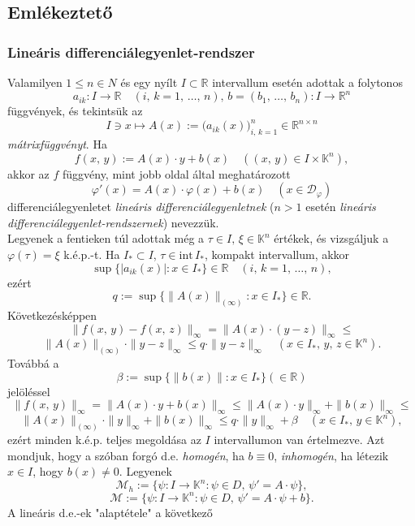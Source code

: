 \documentclass{article}
\newcommand{\R}{\mathbb{R}}
\newcommand{\K}{\mathbb{K}}
\newcommand{\Dp}{\mathcal{D}_\varphi}
\begin{document}
	\subsection{Emlékeztető}
	\subsubsection{Lineáris differenciálegyenlet-rendszer}
	Valamilyen $1 \leq n \in N$ és egy nyílt $I \subset \R$ intervallum esetén adottak a folytonos
	\[
		a_{ik} : I \to \R \quad (i, \, k = 1, \, \dots, \, n), \, b = (b_1, \, \dots, \, b_n) : I \to \R^n
	\]
	függvények, és tekintsük az
	\[
		I \ni x \mapsto A(x) := \big( a_{ik}(x) \big)_{i, \, k =1}^n \in \R^{n \times n}
	\]
	\textit{mátrixfüggvényt}. Ha
	\[
		f(x, \, y) := A(x) \cdot y + b(x) \quad ((x, \, y) \in I \times \K^n),
	\]
	akkor az $f$ függvény, mint jobb oldal által meghatározott
	\[
		\varphi'(x) = A(x) \cdot \varphi(x) + b(x) \quad (x \in \Dp)
	\]
	differenciálegyenletet \textit{lineáris differenciálegyenletnek} ($n > 1$ esetén \textit{lineáris} \textit{differenciálegyenlet-rendszernek}) nevezzük.\\
	
	Legyenek a fentieken túl adottak még a $\tau \in I, \, \xi \in \K^n$ értékek, és vizsgáljuk a $\varphi(\tau) = \xi$ k.é.p.-t. Ha $I_* \subset I$, $\tau \in \text{int} \, I_*$, kompakt intervallum, akkor
	\[
		\sup \{ |a_{ik}(x)| : x \in I_* \} \in \R \quad (i, \, k = 1, \, \dots, \, n),
	\]
	ezért
	\[
		q := \sup \{ \|A(x)\|_{(\infty)} : x \in I_* \} \in \R.
	\]
	Következésképpen
	\[
		\| f(x, \, y) - f(x, \, z) \|_\infty = \| A(x) \cdot (y- z) \|_\infty \leq
	\]
	\[
		\|A(x)\|_{(\infty)} \cdot \|y-z\|_\infty \leq q \cdot \|y-z\|_\infty \quad (x \in I_*, \, y, \, z \in \K^n).
	\]
	Továbbá a
	\[
		\beta := \sup\{\|b(x)\| : x \in I_*\} (\in \R)
	\]
	jelöléssel
	\[
		\|f(x, \, y)\|_\infty = \| A(x) \cdot y + b(x) \|_\infty \leq \|A(x) \cdot y\|_\infty + \|b(x)\|_\infty \leq
	\]
	\[
		\|A(x)\|_{(\infty)} \cdot \|y\|_\infty + \|b(x)\|_\infty \leq q \cdot \|y\|_\infty + \beta \quad (x \in I_*, \, y \in \K^n),
	\]
	ezért minden k.é.p. teljes megoldása az $I$ intervallumon van értelmezve. Azt mondjuk, hogy a szóban forgó d.e. \textit{homogén}, ha $b \equiv 0$, \textit{inhomogén}, ha létezik $x \in I$, hogy $b(x) \neq 0$. Legyenek
	\[
		\mathcal{M}_h := \{ \psi : I \to \K^n : \psi \in D, \, \psi' = A \cdot \psi \},
	\]
	\[
		\mathcal{M} := \{ \psi : I \to \K^n : \psi \in D, \, \psi' = A \cdot \psi + b\}.
	\]
	A lineáris d.e.-ek "alaptétele" a következő\\
	
\end{document}
